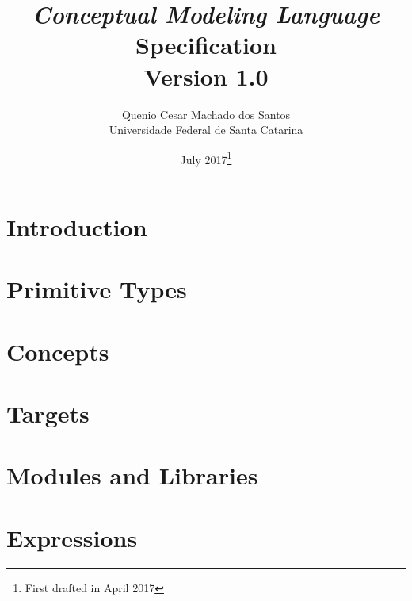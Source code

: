 \documentclass[ebook,oneside,12pt]{memoir}
\title{\emph{Conceptual Modeling Language}\\Specification\\ \small{Version 1.0}}
\author{Quenio Cesar Machado dos Santos\\ \small{Universidade Federal de Santa Catarina}}
\date{July 2017\thanks{First drafted in April 2017}}
\begin{document}
\begin{titlingpage}
\maketitle
\end{titlingpage}

\frontmatter

\mainmatter

\chapter{Introduction}

\chapter{Primitive Types}

\chapter{Concepts}

\chapter{Targets}

\chapter{Modules and Libraries}

\chapter{Expressions}

\backmatter
\end{document}
